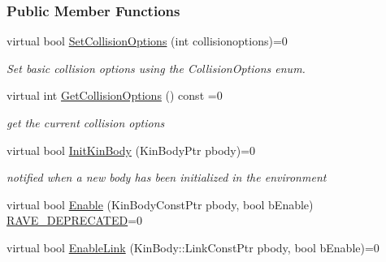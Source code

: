 \subsubsection*{Public Member Functions}
\begin{DoxyCompactItemize}
\item 
\hypertarget{classOpenRAVE_1_1CollisionCheckerBase_a41d4f0db9db82ee4517d5f375fea35f4}{
virtual bool \hyperlink{classOpenRAVE_1_1CollisionCheckerBase_a41d4f0db9db82ee4517d5f375fea35f4}{SetCollisionOptions} (int collisionoptions)=0}
\label{classOpenRAVE_1_1CollisionCheckerBase_a41d4f0db9db82ee4517d5f375fea35f4}

\begin{DoxyCompactList}\small\item\em Set basic collision options using the CollisionOptions enum. \item\end{DoxyCompactList}\item 
\hypertarget{classOpenRAVE_1_1CollisionCheckerBase_a0427686b93fdaf70674eb7d753fae48c}{
virtual int \hyperlink{classOpenRAVE_1_1CollisionCheckerBase_a0427686b93fdaf70674eb7d753fae48c}{GetCollisionOptions} () const =0}
\label{classOpenRAVE_1_1CollisionCheckerBase_a0427686b93fdaf70674eb7d753fae48c}

\begin{DoxyCompactList}\small\item\em get the current collision options \item\end{DoxyCompactList}\item 
\hypertarget{classOpenRAVE_1_1CollisionCheckerBase_af137ac3b8d17b51632c04a450d415003}{
virtual bool \hyperlink{classOpenRAVE_1_1CollisionCheckerBase_af137ac3b8d17b51632c04a450d415003}{InitKinBody} (KinBodyPtr pbody)=0}
\label{classOpenRAVE_1_1CollisionCheckerBase_af137ac3b8d17b51632c04a450d415003}

\begin{DoxyCompactList}\small\item\em notified when a new body has been initialized in the environment \item\end{DoxyCompactList}\item 
virtual bool \hyperlink{classOpenRAVE_1_1CollisionCheckerBase_a1217341e547ceb062850dc9d05f4f409}{Enable} (KinBodyConstPtr pbody, bool bEnable) \hyperlink{namespaceOpenRAVE_af23fc4c2c72950a8c02f38ef71680bc6}{RAVE\_\-DEPRECATED}=0
\item 
virtual bool \hyperlink{classOpenRAVE_1_1CollisionCheckerBase_aad5eb39360dbde52e90efd9f2a466ab4}{EnableLink} (KinBody::LinkConstPtr pbody, bool bEnable)=0
\end{DoxyCompactItemize}
